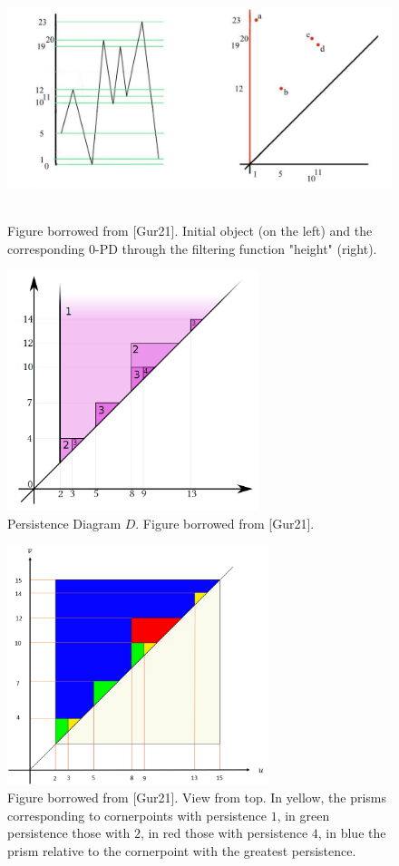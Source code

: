 \documentclass[english, LaM, oneside, noexaminfo]{sapthesis}
\begin{document}
\begin{figure}[tb]
\centering
\includegraphics[height=7cm]{filtration example.png}
\caption{Figure borrowed from [Gur21]. Initial object (on the left) and the corresponding $0$-PD through the filtering function
"height" (right).}\label{fig:filtration example}
\end{figure}

\begin{figure}[tb]
\centering
\includegraphics[height=7cm]{Ziggurat 2D.png}
\caption{Persistence Diagram $D$. Figure borrowed from [Gur21].}\label{fig:Ziggurat 2D}
\end{figure}

\begin{figure}[tb]
\centering
\includegraphics[height=7cm]{Ziggurat 1.png}
\caption{Figure borrowed from [Gur21]. View from top. In yellow, the prisms corresponding to cornerpoints with
persistence $1$, in green persistence those with $2$, in red those with persistence $4$, in blue the prism relative to the cornerpoint with the greatest persistence.
}\label{fig:Ziggurat 1}
\end{figure}
\end{document}
